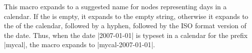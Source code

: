 \begin{command}{\pgfcalendarsuggestedname}
    This macro expands to a suggested name for nodes representing days in a
    calendar. If the  is empty, it expands to the empty string,
    otherwise it expands to the  of the calendar, followed by a
    hyphen, followed by the ISO format version of the date. Thus, when the date
    |2007-01-01| is typeset in a calendar for the prefix |mycal|, the macro
    expands to |mycal-2007-01-01|.
\end{command}
